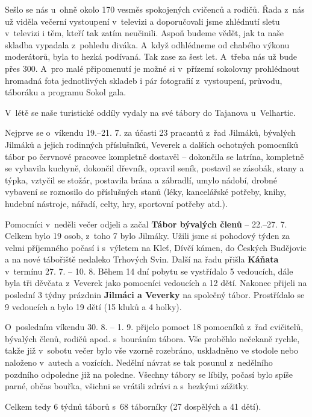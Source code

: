 \documentclass[11pt]{article}
\begin{document}
Sešlo se nás u~ohně okolo 170 vesměs spokojených cvičenců a rodičů. Řada z~nás už viděla večerní vystoupení v~televizi a doporučovali jsme zhlédnutí sletu v~televizi i těm, kteří tak zatím neučinili. Aspoň budeme vědět, jak ta naše skladba vypadala z~pohledu diváka. A~když odhlédneme od chabého výkonu moderátorů, byla to hezká podívaná. Tak zase za šest let. A~třeba nás už bude přes 300. A~pro malé připomenutí je možné si v~přízemí sokolovny prohlédnout hromadná fota jednotlivých skladeb i pár fotografií z~vystoupení, průvodu, táboráku a programu Sokol gala.

V~létě se naše turistické oddíly vydaly na své tábory do Tajanova u~Velhartic. 

Nejprve se o~víkendu 19.–21. 7. za účasti 23 pracantů z~řad Jilmáků, bývalých Jilmáků a jejich rodinných příslušníků, Veverek a dalších ochotných pomocníků tábor po červnové pracovce kompletně dostavěl – dokončila se latrína, kompletně se vybavila kuchyně, dokončil dřevník, opravil seník, postavil se zásobák, stany a týpka, vztyčil se stožár, postavila brána a zábradlí, umylo nádobí, drobné vybavení se roznosilo do příslušných stanů (léky, kancelářské potřeby, knihy, hudební nástroje, nářadí, celty, hry, sportovní potřeby atd.).

Pomocníci v~neděli večer odjeli a začal \textbf{Tábor bývalých členů} – 22.–27. 7. Celkem bylo 19 osob, z~toho 7 bylo Jilmáky. Užili jsme si pohodový týden za velmi příjemného počasí i s~výletem na Kleť, Dívčí kámen, do Českých Budějovic a na nové tábořiště nedaleko Trhových Svin. Další na řadu přišla \textbf{Káňata} v~termínu 27. 7. – 10. 8. Během 14 dní pobytu se vystřídalo 5 vedoucích, dále byla tři děvčata z~Veverek jako pomocníci vedoucích a 12 dětí. Nakonec přijeli na poslední 3 týdny prázdnin \textbf{Jilmáci a Veverky} na společný tábor. Prostřídalo se 9 vedoucích a bylo 19 dětí (15 kluků a 4 holky).

O~posledním víkendu 30. 8. – 1. 9. přijelo pomoct 18 pomocníků z~řad cvičitelů, bývalých členů, rodičů apod. s~bouráním tábora. Vše proběhlo nečekaně rychle, takže již v~sobotu večer bylo vše vzorně rozebráno, uskladněno ve stodole nebo naloženo v~autech a vozících. Nedělní návrat se tak posunul z~nedělního pozdního odpoledne již na poledne. Všechny tábory se líbily, počasí bylo spíše parné, občas bouřka, všichni se vrátili zdrávi a s~hezkými zážitky. 

Celkem tedy 6 týdnů táborů s~68 táborníky (27 dospělých a 41 dětí).

\end{document}
